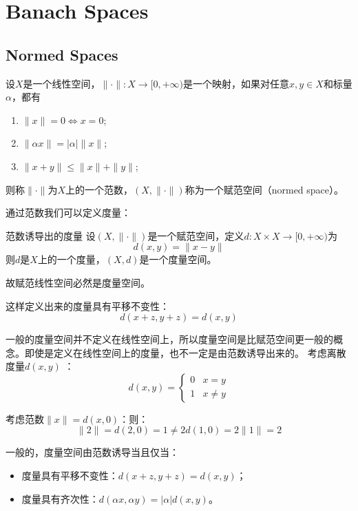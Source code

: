 \chapter{Banach Spaces}
\section{Normed Spaces}

\begin{definition}
    设$X$是一个线性空间，$\|\cdot\|:X\to [0,+\infty)$是一个映射，如果对任意$x,y\in X$和标量$\alpha$，都有
    \begin{enumerate}
        \item $\|x\|=0 \Leftrightarrow x=0$;
        \item $\|\alpha x\|=|\alpha|\|x\|$;
        \item $\|x+y\|\leq \|x\|+\|y\|$;
    \end{enumerate}
    则称$\|\cdot\|$为$X$上的一个范数，$(X,\|\cdot\|)$称为一个赋范空间（normed space）。
\end{definition}

通过范数我们可以定义度量：

\begin{definition}{范数诱导出的度量}
    设$(X,\|\cdot\|)$是一个赋范空间，定义$d:X\times X\to [0,+\infty)$为
    \[
        d(x,y)=\|x-y\|
    \]
    则$d$是$X$上的一个度量，$(X,d)$是一个度量空间。
\end{definition}

故赋范线性空间必然是度量空间。

这样定义出来的度量具有平移不变性：\[
    d(x+z,y+z)=d(x,y)
\]

一般的度量空间并不定义在线性空间上，所以度量空间是比赋范空间更一般的概念。即使是定义在线性空间上的度量，也不一定是由范数诱导出来的。
考虑离散度量\(d(x,y)\) ：
\[
    d(x,y)=
    \begin{cases}
        0 & x=y\\
        1 & x\neq y
    \end{cases}
\]

考虑范数\( \|x\| = d(x,0)\)：则：
\[
    \|2\| = d(2,0) = 1 \neq 2 d(1,0) = 2 \|1\|=2
\]

一般的，度量空间由范数诱导当且仅当：
\begin{itemize}
    \item 度量具有平移不变性：\(d(x+z,y+z)=d(x,y)\)；
    \item 度量具有齐次性：\(d(\alpha x, \alpha y) = |\alpha| d(x,y)\)。
\end{itemize}